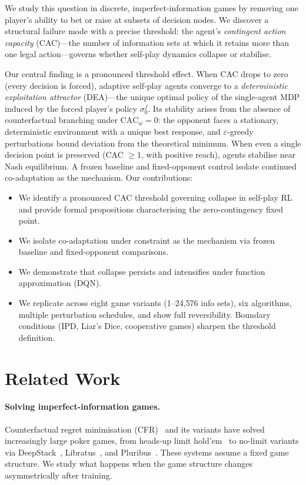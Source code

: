 \documentclass{article}
\begin{document}
We study this question in discrete, imperfect-information games by removing one player's ability to bet or raise at subsets of decision nodes. We discover a structural failure mode with a precise threshold: the agent's \emph{contingent action capacity} (CAC)---the number of information sets at which it retains more than one legal action---governs whether self-play dynamics collapse or stabilise.

Our central finding is a pronounced threshold effect. When CAC drops to zero (every decision is forced), adaptive self-play agents converge to a \emph{deterministic exploitation attractor} (DEA)---the unique optimal policy of the single-agent MDP induced by the forced player's policy $\sigma_0^f$. Its stability arises from the absence of counterfactual branching under $\text{CAC}_w = 0$: the opponent faces a stationary, deterministic environment with a unique best response, and $\varepsilon$-greedy perturbations bound deviation from the theoretical minimum. When even a single decision point is preserved (CAC $\geq 1$, with positive reach), agents stabilise near Nash equilibrium. A frozen baseline and fixed-opponent control isolate continued co-adaptation as the mechanism. Our contributions:
\begin{itemize}
  \item We identify a pronounced CAC threshold governing collapse in self-play RL and provide formal propositions characterising the zero-contingency fixed point.
  \item We isolate co-adaptation under constraint as the mechanism via frozen baseline and fixed-opponent comparisons.
  \item We demonstrate that collapse persists and intensifies under function approximation (DQN).
  \item We replicate across eight game variants (1--24{,}576 info sets), six algorithms, multiple perturbation schedules, and show full reversibility. Boundary conditions (IPD, Liar's Dice, cooperative games) sharpen the threshold definition.
\end{itemize}

\section{Related Work}

\paragraph{Solving imperfect-information games.}
Counterfactual regret minimisation (CFR)~\citep{zinkevich2007regret} and its variants have solved increasingly large poker games, from heads-up limit hold'em~\citep{bowling2015heads} to no-limit variants via DeepStack~\citep{moravcik2017deepstack}, Libratus~\citep{brown2018superhuman}, and Pluribus~\citep{brown2019superhuman}. These systems assume a fixed game structure. We study what happens when the game structure changes asymmetrically after training.
\end{document}

